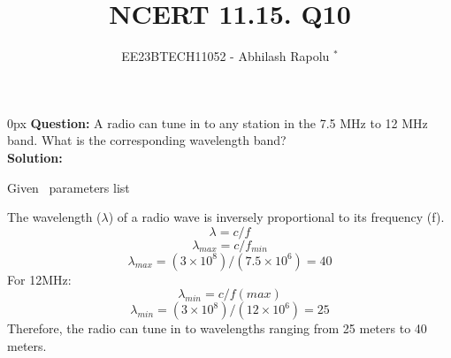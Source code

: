 \documentclass[journal,12pt,twocolumn]{IEEEtran}
\begin{document}

\vspace{3cm}
\title{NCERT 11.15. Q10}
\author{EE23BTECH11052 - Abhilash Rapolu $^{*}$%
}
\maketitle
\newpage
\bigskip
\renewcommand{\thetable}{\arabic{table}}

\parindent 0px
\textbf{Question:} A radio can tune in to any station in the 7.5 MHz to 12 MHz band.
 What is the corresponding wavelength band? \\
\textbf{Solution:}  
\begin{table}[htbp] \small
\centering

\caption{Given \, parameters list}\end{table}
The wavelength ($\lambda$) of a radio wave is inversely proportional to its frequency (f).
\bgroup \obeylines
$$\lambda=c/f$$
$$\lambda_{max}=c/f_{min}$$
\egroup
\begin{equation}
\lambda_{max}=(3\times10^{8})/(7.5\times10^{6})=40
\end{equation}
For 12MHz:
$$\lambda_{min}=c/f(max)$$
\begin{equation}
\lambda_{min}=(3\times10^{8})/(12\times10^{6})=25
\end{equation}
Therefore, the radio can tune in to wavelengths ranging from 25 meters to 40 meters.
\end{document}
